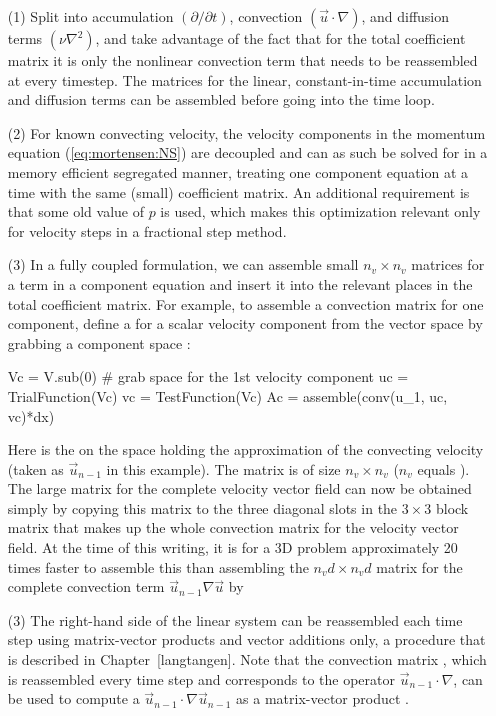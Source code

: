 \begin{itemize}
 \item[(1)] Split  into accumulation $(\partial /\partial t)$,
convection $(\vec{u}\cdot\nabla)$, and diffusion terms
$(\nu\nabla^2)$, and take advantage of the fact that for the total
coefficient matrix it is only the nonlinear convection term that needs
to be reassembled at every timestep. The matrices for the linear,
constant-in-time accumulation and diffusion terms can be assembled
before going into the time loop.

\item[(2)] For known convecting velocity, 
 the velocity components in the momentum equation (\eqref{eq:mortensen:NS})
 are decoupled and can as such be solved for in a
 memory efficient segregated manner, treating one component equation
 at a time with the same (small) coefficient matrix. An additional requirement is that some old value of $p$ is used,
 which makes this optimization relevant only for velocity steps in
 a fractional step method.

\item[(3)]
 In a fully coupled formulation,
 we can assemble small $n_v\times n_v$ matrices for a term in a
 component equation and insert it into the relevant places in
 the total coefficient matrix.
 For example, to assemble a convection matrix for one component, define
 a  for a scalar velocity component from the 
 vector space  by grabbing a component space :
\begin{python}
Vc = V.sub(0)  # grab space for the 1st velocity component
uc = TrialFunction(Vc)
vc = TestFunction(Vc)
Ac = assemble(conv(u_1, uc, vc)*dx)
\end{python}
Here  is the  on the space 
holding the approximation of the
convecting velocity (taken as $\vec{u}_{n-1}$ in this example). 
The matrix  is of size $n_v\times n_v$ ($n_v$ equals
).
The large matrix for the complete velocity vector field can now be
obtained simply by copying this  matrix to the three diagonal
slots in the $3\times 3$ block matrix that makes up the whole
convection matrix for the velocity vector field.  At the time of this
writing, it is for a 3D problem approximately 20 times faster to
assemble this  than assembling the $n_vd\times n_vd$ matrix
for the complete convection term $\vec{u}_{n-1}\nabla
\vec{u}$ by 

\item[(3)] The right-hand side of the linear system
can be reassembled each time step using matrix-vector products and
vector additions only, a procedure that is described in
Chapter~[langtangen]. Note that the convection matrix ,
which is reassembled every time step and corresponds to the
operator $\vec{u}_{n-1}\cdot\nabla$, can be used to compute a
$\vec{u}_{n-1}\cdot\nabla\vec{u}_{n-1}$ as a matrix-vector
product .


\end{itemize}
